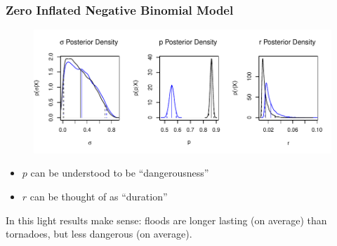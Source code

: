 \documentclass{beamer}
\begin{document}
	\begin{frame}
		\frametitle{Zero Inflated Negative Binomial Model}
		\begin{figure}[p]
			\centering
			\includegraphics[width=.8\textwidth]{figure/zinbdensity-1} 
		\end{figure} 
		\begin{itemize}
			\item{$p$ can be understood to be ``dangerousness''}
			\item{$r$ can be thought of as ``duration''}
		\end{itemize}
		In this light results make sense: floods are longer lasting (on average) than tornadoes, but less dangerous (on average).
	\end{frame}
	
\end{document}
